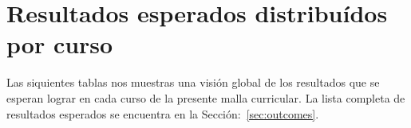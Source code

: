 \section{Resultados esperados distribuídos por curso}\label{sec:outcomes-by-course}
Las siquientes tablas nos muestras una visión global de los resultados que se esperan lograr en cada 
curso de la presente malla curricular. 
La lista completa de resultados esperados se encuentra en la Sección:~\ref{sec:outcomes}.

